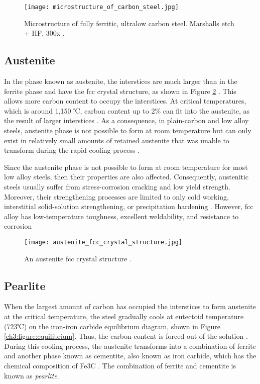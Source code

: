 \begin{figure}[H]
    \centering
    \texttt{[image: microstructure\_of\_carbon\_steel.jpg]}
    \caption{Microstructure of fully ferritic, ultralow carbon steel. Marshalls etch + HF, 300x \cite{molabe2018determining}.}
    \label{ch3:figure:microstructure}
\end{figure}

\subsection{Austenite} 
In the phase known as austenite, the interstices are much larger than in the ferrite phase and have the fcc crystal structure, as shown in Figure \ref{ch3:figure:austenite} \cite{bajaj2020steels}. This allows more carbon content to occupy the interstices. At critical temperatures, which is around 1,150 ℃, carbon content up to 2\% can fit into the austenite, as the result of larger interstices \cite{bhadeshia2017steels}. As a consequence, in plain-carbon and low alloy steels, austenite phase is not possible to form at room temperature but can only exist in relatively small amounts of retained austenite that was unable to transform during the rapid cooling process \cite{molabe2018determining}.

Since the austenite phase is not possible to form at room temperature for most low alloy steels, then their properties are also affected. Consequently, austenitic steels usually suffer from stress-corrosion cracking and low yield strength. Moreover, their strengthening processes are limited to only cold working, interstitial solid-solution strengthening, or precipitation hardening \cite{molabe2018determining}. However, fcc alloy has low-temperature toughness, excellent weldability, and resistance to corrosion \cite{bhadeshia2017steels}
 
\begin{figure}[H]
    \centering
    \texttt{[image: austenite\_fcc\_crystal\_structure.jpg]}
    \caption{An austenite fcc crystal structure \cite{bajaj2020steels}.}
    \label{ch3:figure:austenite}
\end{figure}

\subsection{Pearlite} 
When the largest amount of carbon has occupied the interstices to form austenite at the critical temperature, the steel gradually cools at eutectoid temperature (723℃) on the iron-iron carbide equilibrium diagram, shown in Figure \ref{ch3:figure:equilibrium}. Thus, the carbon content is forced out of the solution \cite{bhadeshia2017steels}. During this cooling process, the austenite transforms into a combination of ferrite and another phase known as cementite, also known as iron carbide, which has the chemical composition of Fe3C \cite{cmrp2014maintenance}. The combination of ferrite and cementite is known as \emph{pearlite}.  

